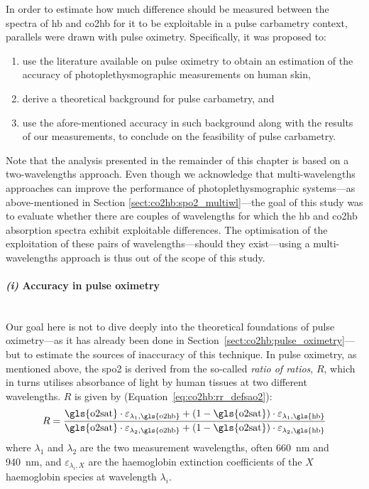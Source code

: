 In order to estimate how much difference should be measured between the spectra of \gls{hb} and \gls{co2hb} for it to be exploitable in a pulse carbametry context, parallels were drawn with pulse oximetry. Specifically, it was proposed to:
\begin{enumerate}[label=\textit{(\roman*)}]
	\item use the literature available on pulse oximetry to obtain an estimation of the accuracy of photoplethysmographic measurements on human skin,
	\item derive a theoretical background for pulse carbametry, and
	\item use the afore-mentioned accuracy in such background along with the results of our measurements, to conclude on the feasibility of pulse carbametry.
\end{enumerate}

Note that the analysis presented in the remainder of this chapter is based on a two-wavelengths approach. Even though we acknowledge that multi-wavelengths approaches can improve the performance of photoplethysmographic systems---as above-mentioned in Section \ref{sect:co2hb:spo2_multiwl}---the goal of this study was to evaluate whether there are couples of wavelengths for which the \gls{hb} and \gls{co2hb} absorption spectra exhibit exploitable differences. The optimisation of the exploitation of these pairs of wavelengths---should they exist---using a multi-wavelengths approach is thus out of the scope of this study.

\paragraph*{\textit{(i)} Accuracy in pulse oximetry} ~\\

Our goal here is not to dive deeply into the theoretical foundations of pulse oximetry---as it has already been done in Section~\ref{sect:co2hb:pulse_oximetry}---but to estimate the sources of inaccuracy of this technique. In pulse oximetry, as mentioned above, the \gls{spo2} is derived from the so-called \emph{ratio of ratios}, $R$, which in turns utilises absorbance of light by human tissues at two different wavelengths. $R$ is given by (Equation~\ref{eq:co2hb:rr_defsao2}):
\begin{equation}\label{eq:co2hb:rr_defspo2}
	R= \frac{\text{\gls{o2sat}} \cdot \varepsilon_{\lambda_1,\text{\gls{o2hb}}} + (1-\text{\gls{o2sat}})\cdot \varepsilon_{\lambda_1,\text{\gls{hb}}}}{\text{\gls{o2sat}} \cdot \varepsilon_{\lambda_2,\text{\gls{o2hb}}} + (1-\text{\gls{o2sat}})\cdot \varepsilon_{\lambda_2,\text{\gls{hb}}}}
\end{equation}
where $\lambda_1$ and $\lambda_2$ are the two measurement wavelengths, often 660~nm and 940~nm, and $\varepsilon_{\lambda_i, X}$ are the haemoglobin extinction coefficients of the $X$ haemoglobin species at wavelength $\lambda_i$.

